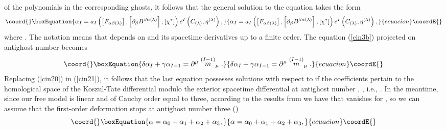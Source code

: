 \documentclass[a4paper,12pt]{article}
\begin{document}
of the polynomials in the corresponding ghosts, it follows that the general
solution to the equation \coordHE{} takes the form
\begin{equation}\coord{}\boxEquation{
\alpha _{I}=a_{I}\left( \left[ F_{\alpha \beta (\lambda )}\right] ,\left[
\partial _{\beta }B^{\beta \alpha (\lambda )}\right] ,\left[ \chi
^{*}\right] \right) e^{I}\left( C_{(\lambda )},\eta ^{(\lambda )}\right) ,
\label{cin20}
}{
\alpha _{I}=a_{I}\left( \left[ F_{\alpha \beta (\lambda )}\right] ,\left[
\partial _{\beta }B^{\beta \alpha (\lambda )}\right] ,\left[ \chi
^{*}\right] \right) e^{I}\left( C_{(\lambda )},\eta ^{(\lambda )}\right) ,
}{ecuacion}\coordE{}\end{equation}
where \coordHE{}. The notation \coordHE{} means that \coordHE{} depends on \coordHE{} and its spacetime
derivatives up to a finite order. The equation (\ref{cin3b}) projected on
antighost number \coordHE{} becomes
\begin{equation}\coord{}\boxEquation{
\delta \alpha _{I}+\gamma \alpha _{I-1}=\partial ^{\mu }\stackrel{(I-1)}{m}
_{\mu }.  \label{cin21}
}{
\delta \alpha _{I}+\gamma \alpha _{I-1}=\partial ^{\mu }\stackrel{(I-1)}{m}
_{\mu }.  }{ecuacion}\coordE{}\end{equation}
Replacing (\ref{cin20}) in (\ref{cin21}), it follows that the last equation
possesses solutions with respect to \coordHE{} if the coefficients \coordHE{} pertain to the homological space of the Koszul-Tate differential
modulo the exterior spacetime differential at antighost number \coordHE{}, \coordHE{}, i.e., \coordHE{}. In the meantime, since our free model is linear
and of Cauchy order equal to three, according to the results from
\cite{gen1} we have that \coordHE{} vanishes
for \coordHE{}, so we can assume that the first-order deformation stops
at antighost number three (\coordHE{})
\begin{equation}\coord{}\boxEquation{
\alpha =\alpha _{0}+\alpha _{1}+\alpha _{2}+\alpha _{3},  \label{cin22}
}{
\alpha =\alpha _{0}+\alpha _{1}+\alpha _{2}+\alpha _{3},  }{ecuacion}\coordE{}\end{equation}
\end{document}
